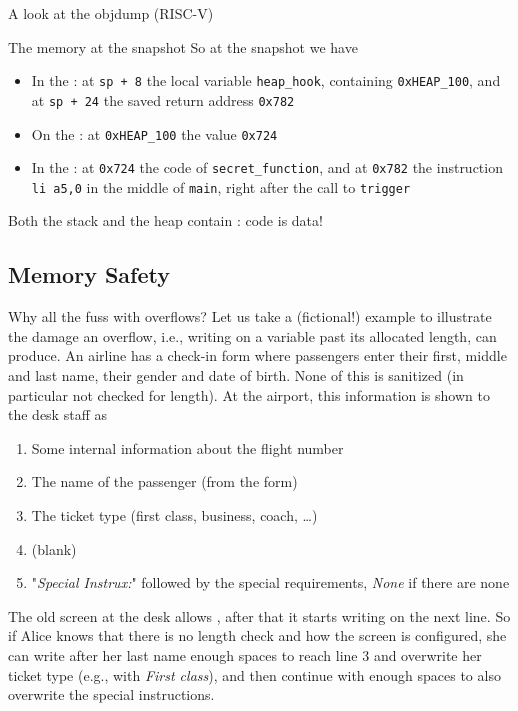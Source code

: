 \begin{parag}{A look at the objdump (RISC-V)}
\begin{enumerate}
    \end{enumerate}
    \begin{subparag}{The memory at the snapshot}
        So at the snapshot we have
        \begin{itemize}
            \item In the : at \texttt{sp + 8} the local variable \texttt{heap\_hook}, containing \texttt{0xHEAP\_100}, and at \texttt{sp + 24} the saved return address \texttt{0x782}
            \item On the : at \texttt{0xHEAP\_100} the value \texttt{0x724}
            \item In the : at \texttt{0x724} the code of \texttt{secret\_function}, and at \texttt{0x782} the instruction \texttt{li a5,0} in the middle of \texttt{main}, right after the call to \texttt{trigger}
        \end{itemize}
        Both the stack and the heap contain : code is data!
    \end{subparag}
\end{parag}

\subsection{Memory Safety}
\begin{parag}{Why all the fuss with overflows?}
    Let us take a (fictional!) example to illustrate the damage an overflow, i.e., writing on a variable past its allocated length, can produce. An airline has a check-in form where passengers enter their first, middle and last name, their gender and date of birth. None of this is sanitized (in particular not checked for length). At the airport, this information is shown to the desk staff as
    \begin{enumerate}
        \item Some internal information about the flight number
        \item The name of the passenger (from the form)
        \item The ticket type (first class, business, coach, \dots)
        \item (blank)
        \item "\textit{Special Instrux:}" followed by the special requirements, \textit{None} if there are none
    \end{enumerate}
    The old screen at the desk allows , after that it starts writing on the next line. So if Alice knows that there is no length check and how the screen is configured, she can write after her last name enough spaces to reach line 3 and overwrite her ticket type (e.g., with \textit{First class}), and then continue with enough spaces to also overwrite the special instructions.
\end{parag}


